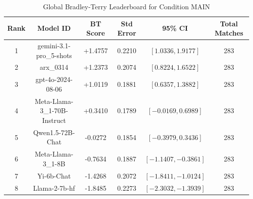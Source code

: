 \begin{table}[ht]
\centering
\caption{Global Bradley-Terry Leaderboard for Condition \textsc{MAIN}}
\label{tab:leaderboard_main}
\begin{tabular}{cccccc}
\hline
\textbf{Rank} & \textbf{Model ID} & \textbf{BT Score} & \textbf{Std Error} & \textbf{95\% CI} & \textbf{Total Matches} \\
\hline
1 & gemini-3.1-pro\_5-shots & +1.4757 & 0.2210 & $[1.0336, 1.9177]$ & 283 \\
2 & arx\_0314 & +1.2373 & 0.2074 & $[0.8224, 1.6522]$ & 283 \\
3 & gpt-4o-2024-08-06 & +1.0119 & 0.1881 & $[0.6357, 1.3882]$ & 283 \\
4 & Meta-Llama-3\_1-70B-Instruct & +0.3410 & 0.1789 & $[-0.0169, 0.6989]$ & 283 \\
5 & Qwen1.5-72B-Chat & -0.0272 & 0.1854 & $[-0.3979, 0.3436]$ & 283 \\
6 & Meta-Llama-3\_1-8B & -0.7634 & 0.1887 & $[-1.1407, -0.3861]$ & 283 \\
7 & Yi-6b-Chat & -1.4268 & 0.2072 & $[-1.8411, -1.0124]$ & 283 \\
8 & Llama-2-7b-hf & -1.8485 & 0.2273 & $[-2.3032, -1.3939]$ & 283 \\
\hline
\end{tabular}
\end{table}
